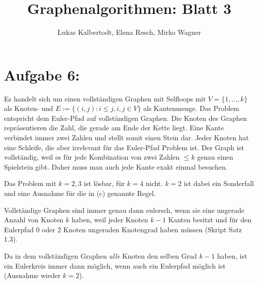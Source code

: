 \documentclass[11pt]{scrartcl} %
\title{Graphenalgorithmen: Blatt 3}
\author{Lukas Kalbertodt, Elena Resch, Mirko Wagner}
\begin{document}
\maketitle
\section*{Aufgabe 6:}
\begin{compactenum}[(a)]
\item Es handelt sich um einen vollständigen Graphen mit Selfloops mit $V = \lbrace {1,...,k} \rbrace $ als Knoten- und $E:= \lbrace (i,j): i \le j, i,j \in V \rbrace$ als Kantenmenge. Das Problem entspricht dem Euler-Pfad auf vollständigen Graphen. 
Die Knoten des Graphen repräsentieren die Zahl, die gerade am Ende der Kette liegt. Eine Kante verbindet immer zwei Zahlen und stellt somit einen Stein dar. Jeder Knoten hat eine Schleife, die aber irrelevant für das Euler-Pfad Problem ist. Der Graph ist vollständig, weil es für jede Kombination von zwei Zahlen $\le k$ genau einen Spielstein gibt. Daher muss man auch jede Kante exakt einmal besuchen.
\item Das Problem mit $k=2,3$ ist lösbar, für $k=4$ nicht. $k=2$ ist dabei ein Sonderfall und eine Ausnahme für die in (c) genannte Regel.
\item Vollständige Graphen sind immer genau dann eulersch, wenn sie eine ungerade Anzahl von Knoten $k$ haben, weil jeder Knoten $k-1$ Kanten besitzt und für den Eulerpfad 0 oder 2 Knoten ungeraden Knotengrad haben müssen (Skript Satz 1.3).
\item Da in dem vollständigen Graphen \emph{alle} Knoten den selben Grad $k-1$ haben, ist ein Eulerkreis immer dann möglich, wenn auch ein Eulerpfad möglich ist (Ausnahme wieder $k=2$).
\end{compactenum}
\end{document}
